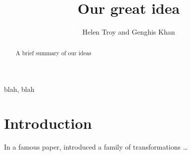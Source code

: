 \documentclass[11pt]{article}
\title{Our great idea}
\author{Helen Troy and Genghis Khan}
\begin{document}
\titlepage

\begin{abstract}
 A brief summary of our ideas
\end{abstract}

\begin{keywords}
  blah, blah
\end{keywords}
\newpage

\section{Introduction}

In a famous paper, \citet{BC64} introduced a family of transformations \dots

\printbibliography
\end{document}
